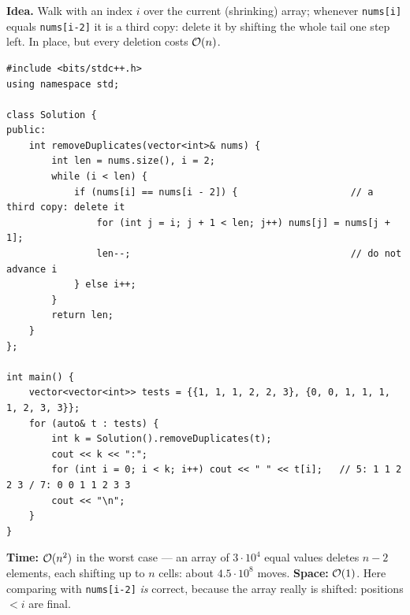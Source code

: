 \begin{bruteforcebox}
\textbf{Idea.} Walk with an index $i$ over the current (shrinking) array; whenever \texttt{nums[i]} equals \texttt{nums[i-2]} it is a third copy: delete it by shifting the whole tail one step left. In place, but every deletion costs $\mathcal{O}(n)$.
\begin{lstlisting}[style=cpp]
#include <bits/stdc++.h>
using namespace std;

class Solution {
public:
    int removeDuplicates(vector<int>& nums) {
        int len = nums.size(), i = 2;
        while (i < len) {
            if (nums[i] == nums[i - 2]) {                    // a third copy: delete it
                for (int j = i; j + 1 < len; j++) nums[j] = nums[j + 1];
                len--;                                       // do not advance i
            } else i++;
        }
        return len;
    }
};

int main() {
    vector<vector<int>> tests = {{1, 1, 1, 2, 2, 3}, {0, 0, 1, 1, 1, 1, 2, 3, 3}};
    for (auto& t : tests) {
        int k = Solution().removeDuplicates(t);
        cout << k << ":";
        for (int i = 0; i < k; i++) cout << " " << t[i];   // 5: 1 1 2 2 3 / 7: 0 0 1 1 2 3 3
        cout << "\n";
    }
}
\end{lstlisting}
\begin{complexitybox}
\textbf{Time:} $\mathcal{O}(n^2)$ in the worst case --- an array of $3\cdot10^4$ equal values deletes $n - 2$ elements, each shifting up to $n$ cells: about $4.5\cdot10^8$ moves. \textbf{Space:} $\mathcal{O}(1)$. Here comparing with \texttt{nums[i-2]} \emph{is} correct, because the array really is shifted: positions $< i$ are final.
\end{complexitybox}
\end{bruteforcebox}

